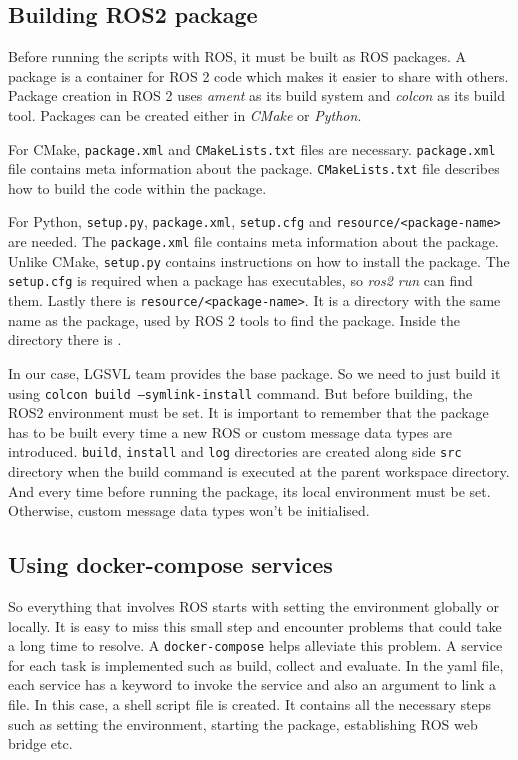 \subsection{Building ROS2 package}
Before running the scripts with ROS, it must be built as ROS packages.  A package is a
container for ROS 2 code which makes it easier to share with others. Package creation in
ROS 2 uses \textit{ament} as its build system and \textit{colcon} as its build tool.
Packages can be created either in \textit{CMake} or \textit{Python}.

For CMake, \texttt{package.xml} and \texttt{CMakeLists.txt} files are necessary. \texttt{package.xml}
file contains meta information about the package. \texttt{CMakeLists.txt} file describes how to build the code within the package.

For Python, \texttt{setup.py}, \texttt{package.xml}, \texttt{setup.cfg} and
\texttt{resource/<package-name>} are needed. The \texttt{package.xml} file contains meta
information about the package. Unlike CMake, \texttt{setup.py} contains instructions on
how to install the package. The \texttt{setup.cfg} is required when a package has
executables, so \textit{ros2 run} can find them. Lastly there is
\texttt{resource/<package-name>}. It is a directory with the same name as the package,
used by ROS 2 tools to find the package. Inside the directory there is \texttt{}.

In our case, LGSVL team provides the base package. So we need to just build it using
\texttt{colcon build --symlink-install} command. But before building, the ROS2 environment
 must be set. It is important to remember that the package has
to be built every time a new ROS or custom message data types are introduced. \texttt{build},
\texttt{install} and \texttt{log} directories are created along side \texttt{src}
directory when the build command is executed at the parent workspace directory. And
every time before running the package, its local environment must be set. Otherwise,
custom message data types won't be initialised.

\subsection{Using docker-compose services}
So everything that involves ROS starts with setting the environment globally or locally.
It is easy to miss this small step and encounter problems that could take a long time to
resolve. A \texttt{docker-compose} helps alleviate this problem. A service for each task
is implemented such as build, collect and evaluate. In the yaml file, each service has a
keyword to invoke the service and also an argument to link a file. In this case, a
shell script file is created. It contains all the necessary steps
such as setting the environment, starting the package, establishing ROS web bridge etc.
\fi

